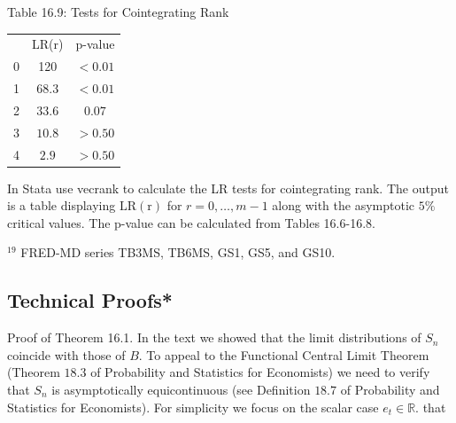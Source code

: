 \documentclass[10pt]{article}
\begin{document}
Table 16.9: Tests for Cointegrating Rank

\begin{tabular}{ccc}
\hline\hline
 & LR(r) & p-value \\
\cline { 2 - 3 }
0 & 120 & $<0.01$ \\
1 & $68.3$ & $<0.01$ \\
2 & $33.6$ & $0.07$ \\
3 & $10.8$ & $>0.50$ \\
4 & $2.9$ & $>0.50$ \\
\hline
\end{tabular}

In Stata use vecrank to calculate the LR tests for cointegrating rank. The output is a table displaying $\mathrm{LR}(\mathrm{r})$ for $r=0, \ldots, m-1$ along with the asymptotic $5 \%$ critical values. The p-value can be calculated from Tables 16.6-16.8.

${ }^{19}$ FRED-MD series TB3MS, TB6MS, GS1, GS5, and GS10.

\subsection{Technical Proofs*}
Proof of Theorem 16.1. In the text we showed that the limit distributions of $S_{n}$ coincide with those of $B$. To appeal to the Functional Central Limit Theorem (Theorem $18.3$ of Probability and Statistics for Economists) we need to verify that $S_{n}$ is asymptotically equicontinuous (see Definition $18.7$ of Probability and Statistics for Economists). For simplicity we focus on the scalar case $e_{t} \in \mathbb{R}$. that
\end{document}
